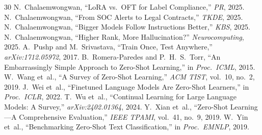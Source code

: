 \documentclass[journal]{IEEEtran}
\begin{document}
\begin{thebibliography}{30}
 N.~Chalaemwongwan, ``LoRA vs.\ OFT for Label Compliance,'' \emph{PR}, 2025.
 N.~Chalaemwongwan, ``From SOC Alerts to Legal Contracts,'' \emph{TKDE}, 2025.
 N.~Chalaemwongwan, ``Bigger Models Follow Instructions Better,'' \emph{KBS}, 2025.
 N.~Chalaemwongwan, ``Higher Rank, More Hallucination?'' \emph{Neurocomputing}, 2025.
 A.~Pushp and M.~Srivastava, ``Train Once, Test Anywhere,'' \emph{arXiv:1712.05972}, 2017.
 B.~Romera-Paredes and P.~H.~S.~Torr, ``An Embarrassingly Simple Approach to Zero-Shot Learning,'' in \emph{Proc.\ ICML}, 2015.
 W.~Wang et~al., ``A Survey of Zero-Shot Learning,'' \emph{ACM TIST}, vol.~10, no.~2, 2019.
 J.~Wei et~al., ``Finetuned Language Models Are Zero-Shot Learners,'' in \emph{Proc.\ ICLR}, 2022.
 T.~Wu et~al., ``Continual Learning for Large Language Models: A Survey,'' \emph{arXiv:2402.01364}, 2024.
 Y.~Xian et~al., ``Zero-Shot Learning—A Comprehensive Evaluation,'' \emph{IEEE TPAMI}, vol.~41, no.~9, 2019.
 W.~Yin et~al., ``Benchmarking Zero-Shot Text Classification,'' in \emph{Proc.\ EMNLP}, 2019.
\end{thebibliography}
\end{document}
